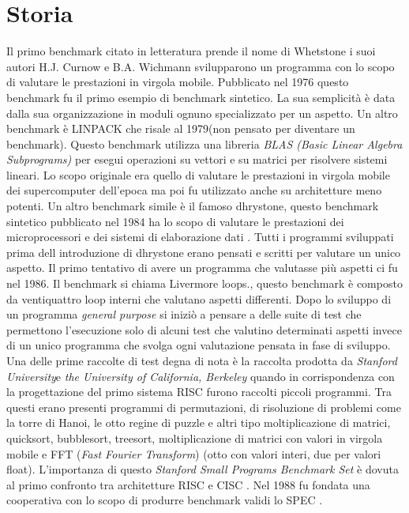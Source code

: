 \documentclass[12pt, a4paper]{report}
\begin{document}
\section{Storia}
Il primo benchmark citato in letteratura prende il nome di Whetstone i suoi autori H.J. Curnow e B.A. Wichmann svilupparono un programma con lo scopo di valutare le prestazioni in virgola mobile. Pubblicato nel 1976 questo benchmark fu il primo esempio di benchmark sintetico. La sua semplicità è data dalla sua organizzazione in moduli ognuno specializzato per un aspetto.
 Un altro benchmark è LINPACK che risale al 1979(non pensato per diventare un benchmark). Questo benchmark utilizza una libreria \textit{BLAS (Basic Linear Algebra Subprograms) } per esegui operazioni su vettori e su matrici per risolvere sistemi lineari. Lo scopo originale era quello di valutare le prestazioni in virgola mobile dei supercomputer dell'epoca ma poi fu utilizzato anche su architetture meno potenti\cite{LinpackSite}.
 Un altro benchmark simile è il famoso dhrystone, questo benchmark sintetico pubblicato nel 1984 ha lo scopo di valutare le prestazioni dei microprocessori e dei sistemi di elaborazione dati \cite{DhrystoneWP}.
 Tutti i programmi sviluppati prima dell introduzione di dhrystone erano pensati e scritti per valutare un unico aspetto. Il primo tentativo di avere un programma che valutasse più aspetti ci fu nel 1986. Il benchmark si chiama Livermore loops., questo benchmark è composto da ventiquattro loop interni che valutano aspetti differenti. 
 Dopo lo sviluppo di un programma \textit{general purpose} si iniziò a pensare a delle suite di test che permettono l'esecuzione solo di alcuni test che valutino determinati aspetti invece di un unico programma che svolga ogni valutazione pensata in fase di sviluppo.
Una delle prime raccolte di test degna di nota è la raccolta prodotta da \textit{Stanford University}e \textit{the University of California, Berkeley} quando in corrispondenza con la progettazione del primo sistema RISC furono raccolti piccoli programmi. Tra questi erano presenti programmi di permutazioni, di risoluzione di problemi come la torre di Hanoi, le otto regine di puzzle e altri tipo moltiplicazione di matrici, quicksort, bubblesort, treesort, moltiplicazione di matrici con valori in virgola mobile e FFT (\textit{Fast Fourier Transform}) (otto con valori interi, due per valori float). L'importanza di questo \textit{Stanford Small Programs Benchmark Set} è dovuta al primo confronto tra architetture RISC e CISC \cite{CommonBench}.
 Nel 1988 fu fondata una cooperativa con lo scopo di produrre benchmark validi lo SPEC \cite{SPECSite}.%
\end{document}
